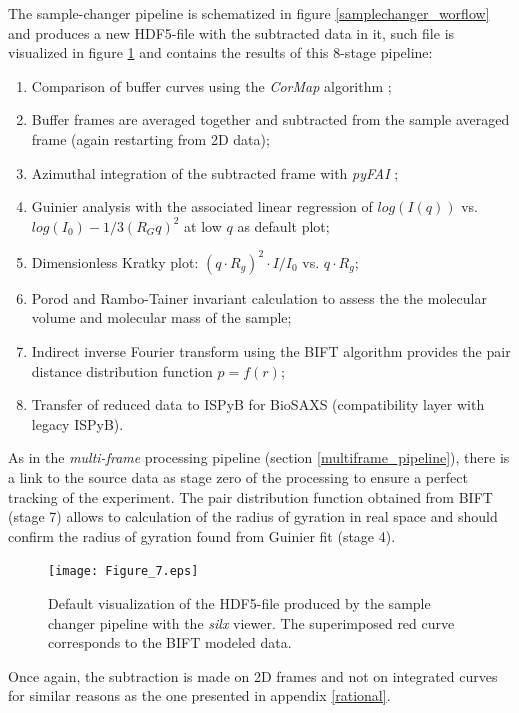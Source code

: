 \documentclass[preprint]{iucr}              %
\begin{document}
The sample-changer pipeline is schematized in figure \ref{samplechanger_worflow} and produces a new HDF5-file with the subtracted data in it, such file is visualized in figure \ref{subtracted} and contains the results of this 8-stage pipeline: 
\begin{enumerate}
    \item Comparison of buffer curves using the \textit{CorMap} algorithm \cite{CorMap};
    \item Buffer frames are averaged together and subtracted from the sample averaged frame (again restarting from 2D data);
    \item Azimuthal integration of the subtracted frame with \textit{pyFAI} \cite{pyfai_2020};
    \item Guinier analysis with the associated linear regression of $log(I(q))$ vs. $log(I_0)-1/3 (R_{G}q)^{2}$ at low $q$ as default plot;
    \item Dimensionless Kratky plot: $(q\cdot R_g)^2\cdot I/I_0$  vs. $q\cdot R_g$;
    \item Porod \cite{glatter+kratky} and Rambo-Tainer invariant \cite{RamboTainerNature2013} calculation to assess the the molecular volume and molecular mass of the sample;
    \item Indirect inverse Fourier transform using the BIFT algorithm \cite{bift} provides the pair distance distribution function $p=f(r)$;
    \item Transfer of reduced data to ISPyB for BioSAXS (compatibility layer with legacy ISPyB).
\end{enumerate}
As in the \textit{multi-frame} processing pipeline (section \ref{multiframe_pipeline}), there is a link to the source data as stage zero of the processing to ensure a perfect tracking of the experiment.
The pair distribution function obtained from BIFT (stage 7) allows to calculation of the radius of gyration in real space and should confirm the radius of gyration found from Guinier fit (stage 4). 

\begin{figure}
    \label{subtracted}
    \texttt{[image: Figure\_7.eps]}
    \caption{Default visualization of the HDF5-file produced by the sample changer pipeline with the \textit{silx} viewer. 
    The superimposed red curve corresponds to the BIFT modeled data.}
\end{figure}



Once again, the subtraction is made on 2D frames and not on integrated curves for similar reasons as the one presented in appendix \ref{rational}.
\end{document}
